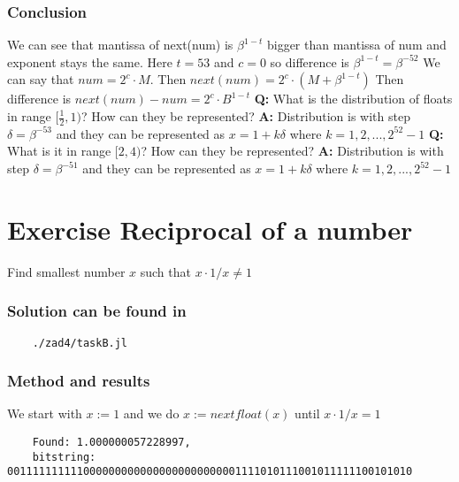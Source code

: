 \documentclass[12pt]{article}
\begin{document}
\subsubsection*{Conclusion}
We can see that mantissa of next(num) is $\beta^{1-t}$ bigger than mantissa of num and
exponent stays the same. Here $t = 53$ and $c = 0$ so difference is $\beta^{1-t} = \beta^{-52}$ \newline
We can say that $num = 2^{c} \cdot M$. Then $next(num) = 2^c \cdot (M + \beta^{1-t})$ \newline
Then difference is $next(num) - num = 2^c \cdot B^{1-t}$ \newline
\textbf{Q:} What is the distribution of floats in range $[\frac{1}{2}, 1)$? How can they be represented?\newline
\textbf{A:} Distribution is with step $\delta=\beta^{-53}$ and they can be represented as $ x = 1 + k\delta $ where $k=1,2,...,2^{52}-1$ \newline
\textbf{Q:} What is it in range $[2, 4)$? How can they be represented? \newline
\textbf{A:} Distribution is with step $\delta=\beta^{-51}$ and they can be represented as $ x = 1 + k\delta $ where $k=1,2,...,2^{52}-1$ \newline
\section{Exercise Reciprocal of a number}
Find smallest number $x$ such that $x \cdot 1/x \neq 1$
\subsubsection*{Solution can be found in}
\begin{verbatim}
    ./zad4/taskB.jl
\end{verbatim}
\subsubsection*{Method and results}
We start with $x := 1$ and we do $x := nextfloat(x)$ until $x \cdot 1/x = 1$
\begin{verbatim}
    Found: 1.000000057228997, 
    bitstring: 0011111111110000000000000000000000001111010111001011111100101010
\end{verbatim}
\end{document}

